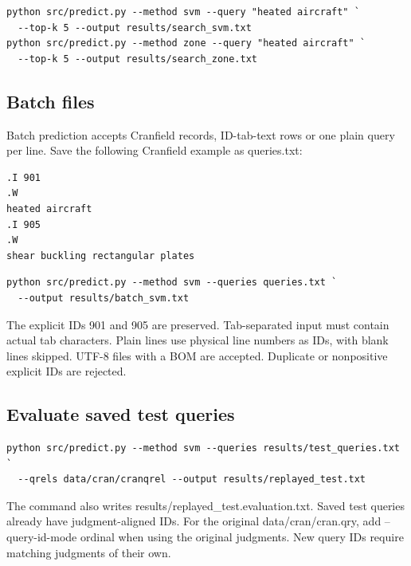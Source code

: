 \documentclass[12pt,a4paper]{article}
\begin{document}
\begin{small}\begin{verbatim}
python src/predict.py --method svm --query "heated aircraft" `
  --top-k 5 --output results/search_svm.txt
python src/predict.py --method zone --query "heated aircraft" `
  --top-k 5 --output results/search_zone.txt
\end{verbatim}\end{small}
\subsection{Batch files}
Batch prediction accepts Cranfield records, ID-tab-text rows or one plain query per line. Save the following Cranfield example as queries.txt:

\begin{small}\begin{verbatim}
.I 901
.W
heated aircraft
.I 905
.W
shear buckling rectangular plates
\end{verbatim}\end{small}
\begin{small}\begin{verbatim}
python src/predict.py --method svm --queries queries.txt `
  --output results/batch_svm.txt
\end{verbatim}\end{small}
The explicit IDs 901 and 905 are preserved. Tab-separated input must contain actual tab characters. Plain lines use physical line numbers as IDs, with blank lines skipped. UTF-8 files with a BOM are accepted. Duplicate or nonpositive explicit IDs are rejected.

\subsection{Evaluate saved test queries}
\begin{small}\begin{verbatim}
python src/predict.py --method svm --queries results/test_queries.txt `
  --qrels data/cran/cranqrel --output results/replayed_test.txt
\end{verbatim}\end{small}
The command also writes results/replayed\_test.evaluation.txt. Saved test queries already have judgment-aligned IDs. For the original data/cran/cran.qry, add --query-id-mode ordinal when using the original judgments. New query IDs require matching judgments of their own.
\end{document}
